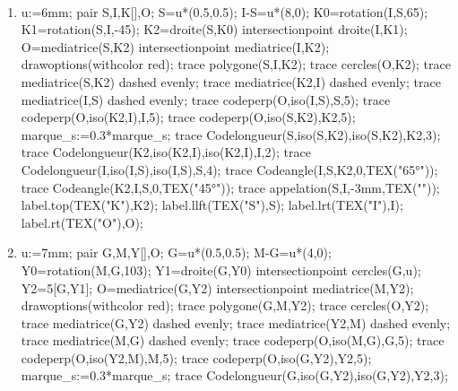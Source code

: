 \begin{corrige}
   \ \\ 
   \begin{enumerate}
      \item\hfil\newline
         \begin{Geometrie}[CoinBG={(0,-2.1u)},CoinHD={(6u,4.2u)}]
            u:=6mm;
            pair S,I,K[],O;
            S=u*(0.5,0.5);
            I-S=u*(8,0);
            K0=rotation(I,S,65);
            K1=rotation(S,I,-45);
            K2=droite(S,K0) intersectionpoint droite(I,K1);
            O=mediatrice(S,K2) intersectionpoint mediatrice(I,K2);
            drawoptions(withcolor red);
            trace polygone(S,I,K2);
            trace cercles(O,K2);
            trace mediatrice(S,K2) dashed evenly;
            trace mediatrice(K2,I) dashed evenly;
            trace mediatrice(I,S) dashed evenly;
            trace codeperp(O,iso(I,S),S,5);
            trace codeperp(O,iso(K2,I),I,5);
            trace codeperp(O,iso(S,K2),K2,5);
            marque_s:=0.3*marque_s;
            trace Codelongueur(S,iso(S,K2),iso(S,K2),K2,3);
            trace Codelongueur(K2,iso(K2,I),iso(K2,I),I,2);
            trace Codelongueur(I,iso(I,S),iso(I,S),S,4);
            trace Codeangle(I,S,K2,0,TEX("\ang{65}"));
            trace Codeangle(K2,I,S,0,TEX("\ang{45}"));
            trace appelation(S,I,-3mm,TEX(""));
            label.top(TEX("K"),K2);
            label.llft(TEX("S"),S);
            label.lrt(TEX("I"),I);
            label.rt(TEX("O"),O);
         \end{Geometrie}
      \item\hfil\newline
         \begin{Geometrie}[CoinBG={(-1.05u,-1.4u)},CoinHD={(7u,5.25u)}]
            u:=7mm;
            pair G,M,Y[],O;
            G=u*(0.5,0.5);
            M-G=u*(4,0);
            Y0=rotation(M,G,103);
            Y1=droite(G,Y0) intersectionpoint cercles(G,u);
            Y2=5[G,Y1];
            O=mediatrice(G,Y2) intersectionpoint mediatrice(M,Y2);
            drawoptions(withcolor red);
            trace polygone(G,M,Y2);
            trace cercles(O,Y2);
            trace mediatrice(G,Y2) dashed evenly;
            trace mediatrice(Y2,M) dashed evenly;
            trace mediatrice(M,G) dashed evenly;
            trace codeperp(O,iso(M,G),G,5);
            trace codeperp(O,iso(Y2,M),M,5);
            trace codeperp(O,iso(G,Y2),Y2,5);
            marque_s:=0.3*marque_s;
            trace Codelongueur(G,iso(G,Y2),iso(G,Y2),Y2,3);

\end{Geometrie}
\end{enumerate}
\end{corrige}
